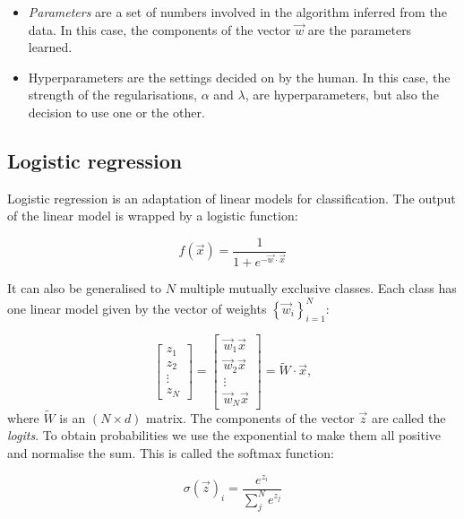 \begin{itemize}
	\item \emph{Parameters} are a set of numbers involved in the algorithm inferred from the data.
	In this case, the components of the vector $\vec{w}$ are the parameters learned.
	\item {Hyperparameters} are the settings decided on by the human.
	In this case, the strength of the regularisations, $\alpha$ and $\lambda$, are hyperparameters, but also the decision to use one or the other.
\end{itemize}
 
\subsection{Logistic regression}\label{sec:logistic_regression}
Logistic regression  is an adaptation of linear models for classification.
The output of the linear model is wrapped by a logistic function:

\begin{equation*}
f(\vec x) = \frac{1}{1 + e^{- \vec{w} \cdot \vec x}}
\end{equation*}

It can also be generalised to $N$ multiple mutually exclusive classes.
Each class has one linear model given by the vector of weights $\left\{\vec w_i \right\}_{i=1} ^N$:

\begin{equation*}
\begin{bmatrix}z_1 \\ z_2 \\ \vdots \\ z_N\end{bmatrix} = 
\begin{bmatrix}
\vec w_1 \vec{x} \\ \vec w_2 \vec{x} \\ \vdots \\ \vec w_N \vec{x}
\end{bmatrix} = 
\widetilde W \cdot \vec{x},
\end{equation*}
where $\widetilde W$ is an $(N \times d)$ matrix.
The components of the vector $\vec{z}$ are called the \emph{logits}. 
To obtain probabilities we use the exponential to make them all positive and normalise the sum.
This is called the softmax function:

\begin{equation*}
\sigma(\vec{z})_i = \frac{e^{z_i}}{\sum_j^N e^{z_j}}
\end{equation*}


